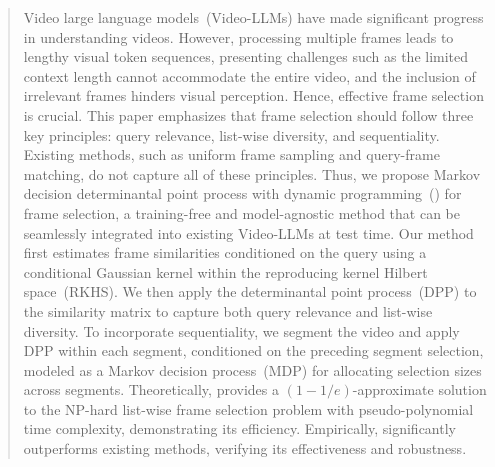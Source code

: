 \begin{abstract}
Video large language models~(Video-LLMs) have made significant progress in understanding videos.
%
However, processing multiple frames leads to lengthy visual token sequences,
presenting challenges such as the limited context length cannot accommodate the entire video,
and the inclusion of irrelevant frames hinders visual perception.
%
Hence, effective frame selection is crucial.
%
This paper emphasizes that frame selection should follow three key principles: query relevance, list-wise diversity, and sequentiality.
Existing methods, such as uniform frame sampling and query-frame matching, do not capture all of these principles.
%
Thus, we propose Markov decision determinantal point process with dynamic programming~(\mname{}) for frame selection,
a training-free and model-agnostic method that can be seamlessly integrated into existing Video-LLMs at test time.
%
Our method first estimates frame similarities conditioned on the query using a conditional Gaussian kernel within the reproducing kernel Hilbert space~(RKHS).
We then apply the determinantal point process~(DPP) to the similarity matrix to capture both query relevance and list-wise diversity.
To incorporate sequentiality, we segment the video and apply DPP within each segment, conditioned on the preceding segment selection, modeled as a Markov decision process~(MDP) for allocating selection sizes across segments. 
%
Theoretically, \mname{} provides a \((1 - 1/e)\)-approximate solution to the NP-hard list-wise frame selection problem with pseudo-polynomial time complexity, demonstrating its efficiency.
Empirically, \mname{} significantly outperforms existing methods, verifying its effectiveness and robustness.
\end{abstract}
